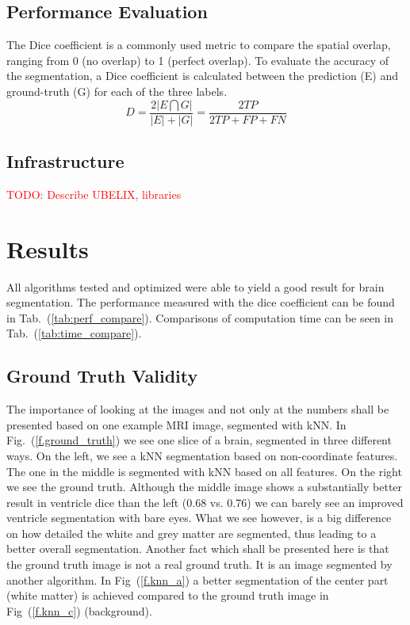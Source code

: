 \documentclass[journal]{IEEEtran}
\newcommand\TODO[1]{\textcolor{red}{TODO: #1}}
\begin{document}
\subsection{Performance Evaluation}\label{ch.eval}
The Dice coefficient is a commonly used metric to compare the spatial overlap, ranging from 0 (no overlap) to 1 (perfect overlap). To evaluate the accuracy of the segmentation, a Dice coefficient is calculated between the prediction (E) and ground-truth (G) for each of the three labels. 
\begin{equation}
D = \frac{2|E \bigcap G|}{|E| + |G|} = \frac{2 TP}{2 TP + FP + FN}
\end{equation}

\subsection{Infrastructure}
\TODO{Describe UBELIX, libraries}


\section{Results}
All algorithms tested and optimized were able to yield a good result for brain segmentation. The performance measured with the dice coefficient can be found in Tab.~(\ref{tab:perf_compare}). Comparisons of computation time can be seen in Tab.~(\ref{tab:time_compare}).\\

\subsection{Ground Truth Validity}

The importance of looking at the images and not only at the numbers shall be presented based on one example MRI image, segmented with kNN. In Fig.~(\ref{f.ground_truth}) we see one slice of a brain, segmented in three different ways. On the left, we see a kNN segmentation based on non-coordinate features. The one in the middle is segmented with kNN based on all features. On the right we see the ground truth. Although the middle image shows a substantially better result in ventricle dice than the left (0.68 vs. 0.76) we can barely see an improved ventricle segmentation with bare eyes. What we see however, is a big difference on how detailed the white and grey matter are segmented, thus leading to a better overall segmentation. Another fact which shall be presented here is that the ground truth image is not a real ground truth. It is an image segmented by another algorithm. In Fig~(\ref{f.knn_a}) a better segmentation of the center part (white matter) is achieved compared to the ground truth image in Fig~(\ref{f.knn_c}) (background).
\end{document}
